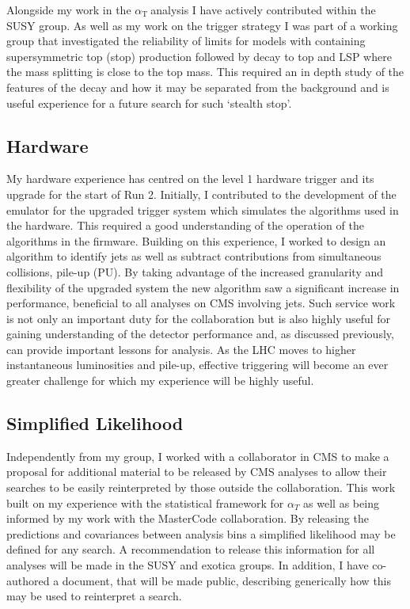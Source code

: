 \documentclass[11pt]{article}
\theoremstyle{plain} \numberwithin{equation}{section}
\theoremstyle{definition}
\DeclareRobustCommand{\alphat}{$\alpha_{\text{T}}~$}
\begin{document}
Alongside my work in the \alphat analysis I have actively contributed within the SUSY group.
As well as my work on the trigger strategy I was part of a working group that investigated
the reliability of limits for models with containing supersymmetric top (stop) production followed by decay 
to top and LSP where the mass splitting is close to the top mass. This required an in depth study of the features of the decay and how it 
may be separated from the background and is useful experience for a future search for such `stealth stop'.

\subsection*{Hardware}
My hardware experience has centred on the level 1 hardware trigger and its
upgrade for the start of Run 2. Initially, I contributed to the development of the emulator for the upgraded
trigger system which simulates the algorithms used in the hardware. This required a good understanding
of the operation of the algorithms in the firmware. Building on this experience, 
I worked to design an algorithm to identify jets as well as subtract contributions from simultaneous collisions, 
pile-up (PU). By taking advantage of the increased granularity and flexibility of the 
upgraded system the new algorithm saw a significant increase in performance, beneficial
to all analyses on CMS involving jets. Such service work is not only an important duty for the collaboration but is also
highly useful for gaining understanding of the detector performance and, as discussed previously,
can provide important lessons for analysis. As the LHC moves to higher instantaneous 
luminosities and pile-up, effective triggering will become an ever greater challenge 
for which my experience will be highly useful. 

\subsection*{Simplified Likelihood}
Independently from my group, I worked with a collaborator in CMS to make a proposal 
for additional material to be released by CMS analyses
to allow their searches to be easily reinterpreted by those outside the collaboration. 
This work built on my experience with the statistical framework for $\alpha_T$ as well as being 
informed by my work with the MasterCode collaboration. By releasing the predictions and covariances between analysis bins 
a simplified likelihood may be defined for any search. A recommendation to release this information for all analyses
will be made in the SUSY and exotica groups. In addition, I have co-authored a document,
that will be made public, describing generically how this may be used to reinterpret a search.
\end{document}
